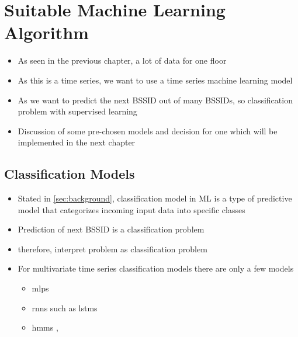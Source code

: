 \chapter{Suitable Machine Learning Algorithm}\label{sec:ml-algo}


\begin{itemize}
    \item As seen in the previous chapter, a lot of data for one floor 
    \item As this is a time series, we want to use a time series machine learning model
    \item As we want to predict the next BSSID out of many BSSIDs, so classification problem with supervised learning
    \item Discussion of some pre-chosen models and decision for one which will be implemented in the next chapter
\end{itemize}

\section{Classification Models}
\begin{itemize}
    \item Stated in \cref{sec:background}, classification model in ML is a type of predictive model that categorizes incoming input data into specific classes
    \item Prediction of next BSSID is a classification problem
    \item therefore, interpret problem as classification problem
    \item For multivariate time series classification models there are only a few models
    \begin{itemize}
        \item \acp{mlp} \cite{TSC}
        \item \acp{rnn} such as \acp{lstm}\cite{lstm-hochreiter}
        \item \acp{hmm} \cite{hmm-movement-prediction}, 
    \end{itemize}
\end{itemize}


